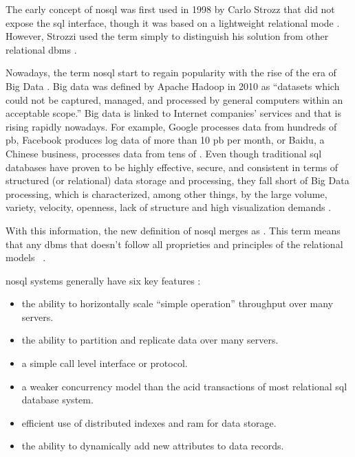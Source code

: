 The early concept of \gls{nosql} was first used in 1998 by Carlo Strozz \cite{NoSQLRel28:online} that did not expose the \gls{sql} interface, though it was based on a lightweight relational mode \cite{breiefreview,nosqlchoose,wuoverview}. However, Strozzi used the term simply to distinguish his solution from other relational \gls{dbms} \cite{nosqlchoose}.

Nowadays, the term \gls{nosql} start to regain popularity with the rise of the era of Big Data \cite{nosqlchoose}. Big data was defined by Apache Hadoop in 2010 as “datasets which could not be captured, managed, and processed by general computers within an acceptable scope.” Big data is linked to Internet companies' services and that is rising rapidly nowadays. For example, Google processes data from hundreds of \gls{pb}, Facebook produces log data of more than 10 \gls{pb} per month, or Baidu, a Chinese business, processes data from tens of  \cite{chen2014big}. Even though traditional \gls{sql} databases have proven to be highly effective, secure, and consistent in terms of structured (or relational) data storage and processing, they fall short of Big Data processing, which is characterized, among other things, by the large volume, variety, velocity, openness, lack of structure and high visualization demands \cite{nosqlchoose,https://doi.org/10.1002/cpe.3398}.

With this information, the new definition of \gls{nosql} merges as . This term means that any \gls{dbms} that doesn't follow all proprieties and principles of the relational models ~\cite{wuoverview,nosqlchoose,breiefreview}. ~

\gls{nosql} systems generally have six key features \cite{cattell2011scalable}:
\begin{itemize}
    \item the ability to horizontally scale “simple operation” throughput over many servers. 
    \item the ability to partition and replicate data over many servers.
    \item a simple call level interface or protocol.
    \item a weaker concurrency model than the \gls{acid} transactions of most relational \gls{sql} database system.
    \item efficient use of distributed indexes and \gls{ram} for
data storage.
    \item the ability to dynamically add new attributes to data records.
\end{itemize}

